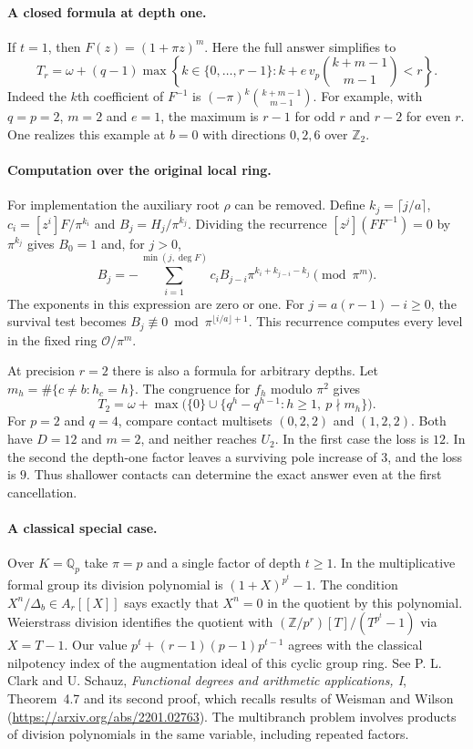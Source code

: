 \paragraph{A closed formula at depth one.}
If $t=1$, then $F(z)=(1+\pi z)^m$. Here the full answer simplifies to
\[
 T_r=\omega+(q-1)\max\left\{k\in\{0,\ldots,r-1\}:         k+e\,v_p\binom{k+m-1}{m-1}<r\right\}.
\]
Indeed the $k$th coefficient of $F^{-1}$ is $(-\pi)^k\binom{k+m-1}{m-1}$. For example, with $q=p=2$, $m=2$ and $e=1$, the maximum is $r-1$ for odd $r$ and $r-2$ for even $r$. One realizes this example at $b=0$ with directions $0,2,6$ over $\mathbb Z_2$.

\paragraph{Computation over the original local ring.}
For implementation the auxiliary root $\rho$ can be removed. Define $k_j=\lceil j/a\rceil$, $c_i=[z^i]F/\pi^{k_i}$ and $B_j=H_j/\pi^{k_j}$. Dividing the recurrence $[z^j](FF^{-1})=0$ by $\pi^{k_j}$ gives $B_0=1$ and, for $j>0$,
\[
 B_j=-\sum_{i=1}^{\min(j,\deg F)}c_i B_{j-i}\pi^{k_i+k_{j-i}-k_j}\pmod{\pi^m}.
\]
The exponents in this expression are zero or one. For $j=a(r-1)-i\ge0$, the survival test becomes $B_j\not\equiv0\bmod\pi^{\lfloor i/a\rfloor+1}$. This recurrence computes every level in the fixed ring $\mathcal O/\pi^m$.

At precision $r=2$ there is also a formula for arbitrary depths. Let $m_h=\#\{c\ne b:h_c=h\}$. The congruence for $f_h$ modulo $\pi^2$ gives
\[
 T_2=\omega+\max\bigl(\{0\}\cup
   \{q^h-q^{h-1}:h\ge1,\ p\nmid m_h\}\bigr).
\]
For $p=2$ and $q=4$, compare contact multisets $(0,2,2)$ and $(1,2,2)$. Both have $D=12$ and $m=2$, and neither reaches $U_2$. In the first case the loss is $12$. In the second the depth-one factor leaves a surviving pole increase of $3$, and the loss is $9$. Thus shallower contacts can determine the exact answer even at the first cancellation.

\paragraph{A classical special case.}
Over $K=\mathbb Q_p$ take $\pi=p$ and a single factor of depth $t\ge1$. In the multiplicative formal group its division polynomial is $(1+X)^{p^t}-1$. The condition $X^n/\Delta_b\in A_r[[X]]$ says exactly that $X^n=0$ in the quotient by this polynomial. Weierstrass division identifies the quotient with $(\mathbb Z/p^r)[T]/(T^{p^t}-1)$ via $X=T-1$. Our value $p^t+(r-1)(p-1)p^{t-1}$ agrees with the classical nilpotency index of the augmentation ideal of this cyclic group ring. See P. L. Clark and U. Schauz, \emph{Functional degrees and arithmetic applications, I}, Theorem~4.7 and its second proof, which recalls results of Weisman and Wilson (\url{https://arxiv.org/abs/2201.02763}). The multibranch problem involves products of division polynomials in the same variable, including repeated factors.
